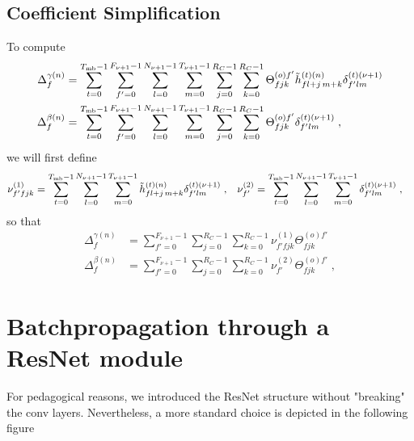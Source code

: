 \begin{subappendices}
\subsection{Coefficient Simplification}

To compute
\begin{align}
\Delta_f^{\gamma(n)}
%
&=\sum_{t=0}^{T_{{\rm mb}}-1}\sum_{f'=0}^{F_{\nu+1}-1}\sum_{l=0}^{N_{\nu+1}-1}\sum_{m=0}^{T_{\nu+1}-1}
%
\sum_{j=0}^{R_C-1}\sum_{k=0}^{R_C-1}\Theta^{(o)f'}_{fjk}
%
\tilde{h}^{(t)(n)}_{fl+j\,m+k}\delta^{(t)(\nu+1)}_{f'lm}\\
%
\Delta_f^{\beta(n)}&=
%
\sum_{t=0}^{T_{{\rm mb}}-1}\sum_{f'=0}^{F_{\nu+1}-1}\sum_{l=0}^{N_{\nu+1}-1}\sum_{m=0}^{T_{\nu+1}-1}
%
\sum_{j=0}^{R_C-1}\sum_{k=0}^{R_C-1}\Theta^{(o)f'}_{fjk}\delta^{(t)(\nu+1)}_{f'lm}\;,
\end{align}
we will first define
\begin{align}
\nu^{(1)}_{f'fjk}&=\sum_{t=0}^{T_{{\rm mb}}-1}\sum_{l=0}^{N_{\nu+1}-1}\sum_{m=0}^{T_{\nu+1}-1}
%
\tilde{h}^{(t)(n)}_{fl+j\,m+k}\delta^{(t)(\nu+1)}_{f'lm}\;,&
%
\nu^{(2)}_{f'}&=\sum_{t=0}^{T_{{\rm mb}}-1}\sum_{l=0}^{N_{\nu+1}-1}\sum_{m=0}^{T_{\nu+1}-1}
%
\delta^{(t)(\nu+1)}_{f'lm}\;,
\end{align}
so that
\begin{align}
\Delta_f^{\gamma(n)}&=\sum_{f'=0}^{F_{\nu+1}-1}\sum_{j=0}^{R_C-1}
%
\sum_{k=0}^{R_C-1}\nu^{(1)}_{f'fjk}\Theta^{(o)f'}_{fjk}\;\\
%
\Delta_f^{\beta(n)}&=
%
\sum_{f'=0}^{F_{\nu+1}-1}\sum_{j=0}^{R_C-1}\sum_{k=0}^{R_C-1}\nu^{(2)}_{f'}\Theta^{(o)f'}_{fjk}\;,
\end{align}


\section{Batchpropagation through a ResNet module}

For pedagogical reasons, we introduced the ResNet structure without "breaking" the conv layers. Nevertheless, a more standard choice is depicted in the following figure


\end{subappendices}
